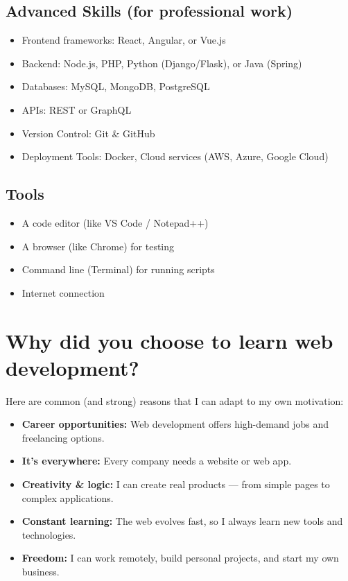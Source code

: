 \documentclass[12pt,a4paper]{article}
\begin{document}
\subsection*{Advanced Skills (for professional work)}
\begin{itemize}
    \item Frontend frameworks: React, Angular, or Vue.js
    \item Backend: Node.js, PHP, Python (Django/Flask), or Java (Spring)
    \item Databases: MySQL, MongoDB, PostgreSQL
    \item APIs: REST or GraphQL
    \item Version Control: Git \& GitHub
    \item Deployment Tools: Docker, Cloud services (AWS, Azure, Google Cloud)
\end{itemize}

\subsection*{Tools}
\begin{itemize}
    \item A code editor (like VS Code / Notepad++)
    \item A browser (like Chrome) for testing
    \item Command line (Terminal) for running scripts
    \item Internet connection
\end{itemize}

\newpage

\section{Why did you choose to learn web development?}

Here are common (and strong) reasons that I can adapt to my own motivation:

\begin{itemize}
    \item \textbf{Career opportunities:} Web development offers high-demand jobs and freelancing options.
    \item \textbf{It’s everywhere:} Every company needs a website or web app.
    \item \textbf{Creativity \& logic:} I can create real products — from simple pages to complex applications.
    \item \textbf{Constant learning:} The web evolves fast, so I always learn new tools and technologies.
    \item \textbf{Freedom:} I can work remotely, build personal projects, and start my own business.
\end{itemize}
\end{document}
